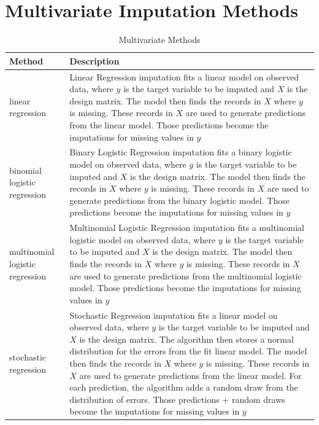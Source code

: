 \documentclass[12pt,oneside]{chicagocapstone}
\begin{document}
\chapter{Multivariate Imputation
Methods}\label{multivariate-imputation-methods}
\begin{longtabu} to 
\caption{\label{tab:appendixfmultivar}Multivariate Methods}\\
\toprule
\begingroup\fontsize{13}{15}\selectfont \textbf{Method}\endgroup & \begingroup\fontsize{13}{15}\selectfont \textbf{Description}\endgroup\\
\midrule
linear regression & Linear Regression imputation fits a linear model on observed data, where $y$ is the target variable to be imputed and $X$ is the design matrix. The model then finds the records in $X$ where $y$ is missing. These records in $X$ are used to generate predictions from the linear model. Those predictions become the imputations for missing values in $y$\\
binomial logistic regression & Binary Logistic Regression imputation fits a binary logistic model on observed data, where $y$ is the target variable to be imputed and $X$ is the design matrix. The model then finds the records in $X$ where $y$ is missing. These records in $X$ are used to generate predictions from the binary logistic model. Those predictions become the imputations for missing values in $y$\\
multinomial logistic regression & Multinomial Logistic Regression imputation fits a multinomial logistic model on observed data, where $y$ is the target variable to be imputed and $X$ is the design matrix. The model then finds the records in $X$ where $y$ is missing. These records in $X$ are used to generate predictions from the multinomial logistic model. Those predictions become the imputations for missing values in $y$\\
stochastic regression & Stochastic Regression imputation fits a linear model on observed data, where $y$ is the target variable to be imputed and $X$ is the design matrix. The algorithm then stores a normal distribution for the errors from the fit linear model. The model then finds the records in $X$ where $y$ is missing. These records in $X$ are used to generate predictions from the linear model. For each prediction, the algorithm adds a random draw from the distribution of errors. Those predictions + random draws become the imputations for missing values in $y$\\

\end{longtabu}
\end{document}
